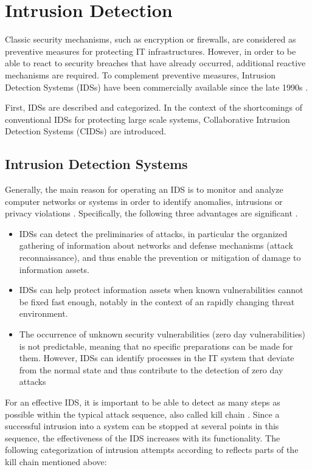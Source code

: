 \section{Intrusion Detection}

Classic security mechanisms, such as encryption or firewalls, are considered as preventive measures for protecting IT infrastructures. However, in order to be able to react to security breaches that have already occurred, additional reactive mechanisms are required. To complement preventive measures, Intrusion Detection Systems (IDSs) have been commercially available since the late 1990s \cite[27]{whitman_principles_2018}.

First, IDSs are described and categorized. In the context of the shortcomings of conventional IDSs for protecting large scale systems, Collaborative Intrusion Detection Systems (CIDSs) are introduced.

\subsection{Intrusion Detection Systems}
Generally, the main reason for operating an IDS is to monitor and analyze computer networks or systems in order to identify anomalies, intrusions or privacy violations \cite{hindy2020taxonomy}. Specifically, the following three advantages are significant \cite[391]{whitman_principles_2018}.

\begin{itemize}
    \item IDSs can detect the preliminaries of attacks, in particular the organized gathering of information about networks and defense mechanisms (attack reconnaissance), and thus enable the prevention or mitigation of damage to information assets.
    \item IDSs can help protect information assets when known vulnerabilities cannot be fixed fast enough, notably in the context of an rapidly changing threat environment.
    \item The occurrence of unknown security vulnerabilities (zero day vulnerabilities) is not predictable, meaning that no specific preparations can be made for them. However, IDSs can identify processes in the IT system that deviate from the normal state and thus contribute to the detection of zero day attacks
\end{itemize}

For an effective IDS, it is important to be able to detect as many steps as possible within the typical attack sequence, also called kill chain \cite[393]{whitman_principles_2018}. Since a successful intrusion into a system can be stopped at several points in this sequence, the effectiveness of the IDS increases with its functionality. The following categorization of intrusion attempts according to \cite{kendall1999database} reflects parts of the kill chain mentioned above:

